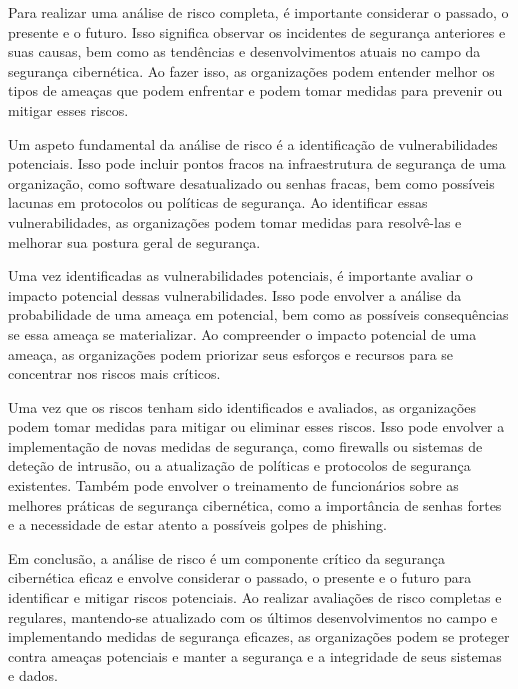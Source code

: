 Para realizar uma análise de risco completa, é importante considerar o passado, o presente e o futuro. Isso significa observar os incidentes de segurança anteriores e suas causas, bem como as tendências e desenvolvimentos atuais no campo da segurança cibernética. Ao fazer isso, as organizações podem entender melhor os tipos de ameaças que podem enfrentar e podem tomar medidas para prevenir ou mitigar esses riscos.

Um aspeto fundamental da análise de risco é a identificação de vulnerabilidades potenciais. Isso pode incluir pontos fracos na infraestrutura de segurança de uma organização, como software desatualizado ou senhas fracas, bem como possíveis lacunas em protocolos ou políticas de segurança. Ao identificar essas vulnerabilidades, as organizações podem tomar medidas para resolvê-las e melhorar sua postura geral de segurança.

Uma vez identificadas as vulnerabilidades potenciais, é importante avaliar o impacto potencial dessas vulnerabilidades. Isso pode envolver a análise da probabilidade de uma ameaça em potencial, bem como as possíveis consequências se essa ameaça se materializar. Ao compreender o impacto potencial de uma ameaça, as organizações podem priorizar seus esforços e recursos para se concentrar nos riscos mais críticos.

Uma vez que os riscos tenham sido identificados e avaliados, as organizações podem tomar medidas para mitigar ou eliminar esses riscos. Isso pode envolver a implementação de novas medidas de segurança, como firewalls ou sistemas de deteção de intrusão, ou a atualização de políticas e protocolos de segurança existentes. Também pode envolver o treinamento de funcionários sobre as melhores práticas de segurança cibernética, como a importância de senhas fortes e a necessidade de estar atento a possíveis golpes de phishing.

Em conclusão, a análise de risco é um componente crítico da segurança cibernética eficaz e envolve considerar o passado, o presente e o futuro para identificar e mitigar riscos potenciais. Ao realizar avaliações de risco completas e regulares, mantendo-se atualizado com os últimos desenvolvimentos no campo e implementando medidas de segurança eficazes, as organizações podem se proteger contra ameaças potenciais e manter a segurança e a integridade de seus sistemas e dados.

\newpage
